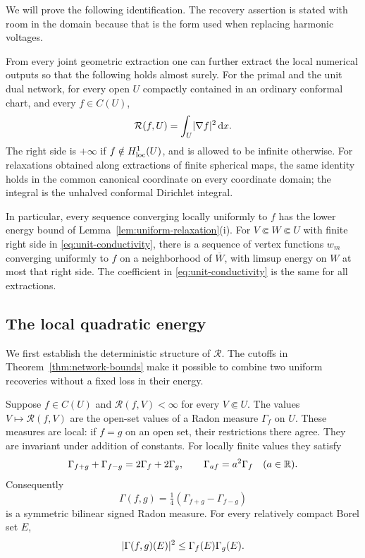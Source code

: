 We will prove the following identification.  The recovery assertion is
stated with room in the domain because that is the form used when replacing
harmonic voltages.

\begin{theorem}\label{thm:conductivity}
From every joint geometric extraction one can further extract the local
numerical outputs so that the following holds almost surely.  For the
primal and the unit dual network, for every open \(U\) compactly contained
in an ordinary conformal chart, and every \(f\in C(U)\),
\begin{equation}\label{eq:unit-conductivity}
 \mathcal R(f,U)=\int_U\lvert \nabla f\rvert^2\,\mathrm d x.
\end{equation}
The right side is \(+\infty\) if \(f\notin H^1_{\rm loc}(U)\), and is
allowed to be infinite otherwise.  For relaxations obtained along extractions
of finite spherical maps, the same identity holds in the common canonical
coordinate on every coordinate domain; the integral is the unhalved conformal
Dirichlet integral.

In particular, every sequence converging locally uniformly to \(f\) has
the lower energy bound of Lemma~\ref{lem:uniform-relaxation}(i).  For
\(V\Subset W\Subset U\) with finite right side in
\eqref{eq:unit-conductivity}, there is a sequence of vertex functions
\(w_m\) converging uniformly to \(f\) on a neighborhood of
\(\overline W\), with limsup energy on \(W\) at most that right side.
The coefficient in
\eqref{eq:unit-conductivity} is the same for all extractions.
\end{theorem}

\subsection{The local quadratic energy}

We first establish the deterministic structure of \(\mathcal R\).  The
cutoffs in Theorem~\ref{thm:network-bounds} make it possible to combine
two uniform recoveries without a fixed loss in their energy.

\begin{lemma}\label{lem:energy-measures}
Suppose \(f\in C(U)\) and \(\mathcal R(f,V)<\infty\) for every
\(V\Subset U\).  The values \(V\mapsto\mathcal R(f,V)\) are the open-set
values of a Radon measure \(\Gamma_f\) on \(U\).  These measures are local:
if \(f=g\) on an open set, their restrictions there agree.  They are
invariant under addition of constants.  For locally finite values they
satisfy
\begin{equation}\label{eq:measure-parallelogram}
 \Gamma_{f+g}+\Gamma_{f-g}=2\Gamma_f+2\Gamma_g,
 \qquad \Gamma_{af}=a^2\Gamma_f\quad(a\in\mathbb R).
\end{equation}
Consequently
\[
 \Gamma(f,g)=\tfrac14(\Gamma_{f+g}-\Gamma_{f-g})
\]
is a symmetric bilinear signed Radon measure.  For every relatively compact
Borel set \(E\),
\begin{equation}\label{eq:measure-cauchy-schwarz}
 \lvert \Gamma(f,g)(E)\rvert^2\le\Gamma_f(E)\Gamma_g(E).
\end{equation}
\end{lemma}


